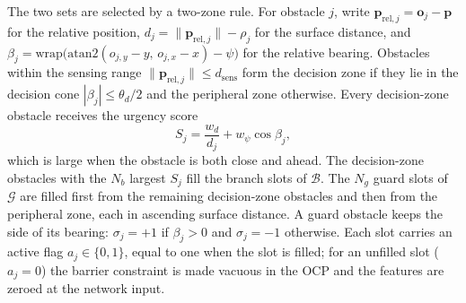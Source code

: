 \documentclass{article}
\theoremstyle{definition}
\begin{document}
The two sets are selected by a two-zone rule. For obstacle $j$, write
$\mathbf{p}_{\mathrm{rel},j}=\mathbf{o}_j-\mathbf{p}$ for the relative position,
$d_j=\lVert\mathbf{p}_{\mathrm{rel},j}\rVert-\rho_j$ for the surface distance,
and
$\beta_j=\mathrm{wrap}\bigl(\mathrm{atan2}(o_{j,y}-y,\,o_{j,x}-x)-\psi\bigr)$
for the relative bearing. Obstacles within the sensing range $\lVert\mathbf{p}_{\mathrm{rel},j}\rVert\le d_{\mathrm{sens}}$ form the decision zone if they lie in the decision cone $|\beta_j|\le\theta_d/2$ and the peripheral zone otherwise. Every
decision-zone obstacle receives the urgency score
\begin{equation}
S_j = \frac{w_d}{d_j} + w_{\psi}\cos\beta_j,
\label{eq:select}
\end{equation}
which is large when the obstacle is both close and ahead. The decision-zone
obstacles with the $N_b$ largest $S_j$ fill the branch slots of $\mathcal{B}$. The $N_g$ guard slots of $\mathcal{G}$ are filled first from the remaining decision-zone obstacles and then from the peripheral zone, each in ascending surface distance. A guard obstacle keeps the side of its bearing: $\sigma_j=+1$ if $\beta_j>0$ and $\sigma_j=-1$ otherwise. Each slot carries an active flag $a_j\in\{0,1\}$, equal
to one when the slot is filled; for an unfilled slot ($a_j=0$) the barrier
constraint is made vacuous in the OCP and the features are zeroed at the
network input.
\end{document}
